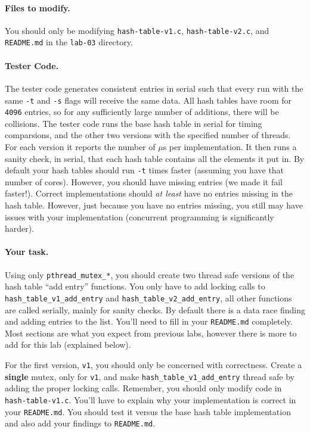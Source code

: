 \paragraph{Files to modify.}

You should only be modifying \texttt{hash-table-v1.c}, \texttt{hash-table-v2.c},
and \texttt{README.md} in the \texttt{lab-03} directory.

\paragraph{Tester Code.}

The tester code generates consistent entries in serial such that every run
with the same \texttt{-t} and \texttt{-s} flags will receive the same data.
All hash tables have room for \texttt{4096} entries, so for any sufficiently
large number of additions, there will be collisions.
The tester code runs the base hash table in serial for timing comparsions,
and the other two versions with the specified number of threads.
For each version it reports the number of $\mu$s per implementation.
It then runs a sanity check, in serial, that each hash table contains all
the elements it put in.
By default your hash tables should run \texttt{-t} times faster (assuming you
have that number of cores).
However, you should have missing entries (we made it fail faster!).
Correct implementations should \textit{at least} have no entries missing in
the hash table.
However, just because you have no entries missing, you still may have issues
with your implementation (concurrent programming is significantly harder).

\paragraph{Your task.}

Using only \texttt{pthread\_mutex\_*}, you should create two thread safe
versions of the hash table ``add entry'' functions.
You only have to add locking calls to \texttt{hash\_table\_v1\_add\_entry}
and \texttt{hash\_table\_v2\_add\_entry}, all other functions are called
serially, mainly for sanity checks.
By default there is a data race finding and adding entries to the list.
You'll need to fill in your \texttt{README.md} completely.
Most sections are what you expect from previous labs, however there is more
to add for this lab (explained below).

For the first version, \texttt{v1}, you should only be concerned with
correctness.
Create a \textbf{single} mutex, only for \texttt{v1}, and make 
\texttt{hash\_table\_v1\_add\_entry} thread safe by adding the proper locking
calls.
Remember, you should only modify code in \texttt{hash-table-v1.c}.
You'll have to explain why your implementation is correct in your
\texttt{README.md}.
You should test it versus the base hash table implementation and also add your
findings to \texttt{README.md}.

